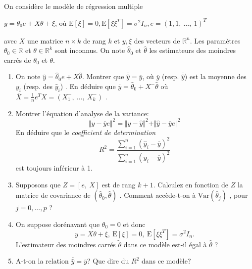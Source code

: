 \documentclass[a4paper,10pt]{article}
\begin{document}
On consid\`{e}re le mod\`{e}le de r\'{e}gression multiple
\begin{center}
$ y=\theta_{0}e+X\theta+\xi$, o\`{u} $\mathrm{E}[\xi]=0, \mathrm{E}[\xi\xi^{T}]=\sigma^{2}I_{n}, e=(1,1,\ \ldots,\ 1)^{T}$
\end{center}
avec $X$ une matrice $n\times k$ de rang $k$ et $y, \xi$ des vecteurs de $\mathbb{R}^{n}$. Les param\`{e}tres $\theta_{0}\in \mathbb{R}$ et $\theta\in \mathbb{R}^{k}$ sont inconnus. On note $\hat{\theta}_{0}$ et $\hat{\theta}$ les estimateurs des moindres carr\'{e}s de $\theta_{0}$ et $\theta.$
\begin{enumerate}
\item On note $\hat{y}=\hat{\theta}_{0}e+X\hat{\theta}$. Montrer que $\overline{\hat{y}}=\overline{y}$, o\`{u} $\overline{y}$ (resp. $\overline{\hat{y}}$) est la moyenne des $y_{i}$ (resp. des $\hat{y}_{i}$) . En d\'{e}duire que $\overline{y}=\hat{\theta}_{0}+X^{-}\hat{\theta}$ o\`{u} $\displaystyle \overline{X}=\frac{1}{n}e^{T}X=(X_{1}^{-},\ \ldots,\ X_{k}^{-})$ .
\item  Montrer l'\'{e}quation d'analyse de la variance:
$$
\Vert y-\overline{y}e\Vert^{2}=\Vert y-\hat{y}\Vert^{2}+\Vert\hat{y}-\overline{y}e\Vert^{2}
$$
En d\'{e}duire que le {\it coefficient de determination}
$$
R^{2}=\frac{\sum_{i=1}^{n}(\hat{y}_{i}-\overline{y})^{2}}{\sum_{i=1}^{n}(y_{i}-\overline{y})^{2}}
$$
est toujours inf\'{e}rieur \`{a} 1.
\item Supposons que $Z=[e,\ X]$ est de rang $k+1$. Calculez en fonction de $Z$ la matrice de covariance de $(\hat{\theta}_{0},\hat{\theta})$ . Comment acc\`{e}de-t-on \`{a} $\mathrm{Var}(\hat{\theta}_{j})$ , pour $j=0, \ldots,p$ ?
\item  On suppose dor\'{e}navant que $\theta_{0}=0$ et donc
$$
y=X\theta+\xi,\ \mathrm{E}[\xi]=0,\ \mathrm{E}[\xi\xi^{T}]=\sigma^{2}I_{n}.
$$
L'estimateur des moindres carr\'{e}s $\tilde{\theta}$ dans ce mod\`{e}le est-il \'{e}gal \`{a} $\hat{\theta}$ ?
\item A-t-on la relation $\overline{\hat{y}}=\overline{y}$? Que dire du $R^{2}$ dans ce mod\`{e}le?
\end{enumerate}
\end{document}
